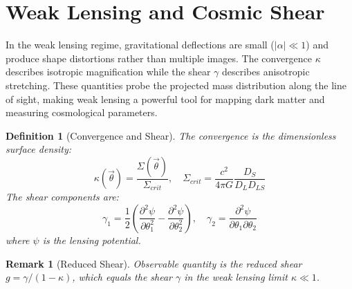 \documentclass[11pt,a4paper]{article}
\newtheorem{definition}{Definition}[section]
\newtheorem{remark}{Remark}[section]
\begin{document}
\section{Weak Lensing and Cosmic Shear}

In the weak lensing regime, gravitational deflections are small ($|\alpha| \ll 1$) and produce
shape distortions rather than multiple images. The convergence $\kappa$ describes isotropic
magnification while the shear $\gamma$ describes anisotropic stretching. These quantities probe
the projected mass distribution along the line of sight, making weak lensing a powerful tool for
mapping dark matter and measuring cosmological parameters.

\begin{definition}[Convergence and Shear]
The convergence is the dimensionless surface density:
\begin{equation}
\kappa(\vec{\theta}) = \frac{\Sigma(\vec{\theta})}{\Sigma_{crit}}, \quad
\Sigma_{crit} = \frac{c^2}{4\pi G} \frac{D_S}{D_L D_{LS}}
\end{equation}
The shear components are:
\begin{equation}
\gamma_1 = \frac{1}{2}\left(\frac{\partial^2 \psi}{\partial \theta_1^2} -
\frac{\partial^2 \psi}{\partial \theta_2^2}\right), \quad
\gamma_2 = \frac{\partial^2 \psi}{\partial \theta_1 \partial \theta_2}
\end{equation}
where $\psi$ is the lensing potential.
\end{definition}

\begin{remark}[Reduced Shear]
Observable quantity is the reduced shear $g = \gamma/(1-\kappa)$, which equals the shear
$\gamma$ in the weak lensing limit $\kappa \ll 1$.
\end{remark}
\end{document}
